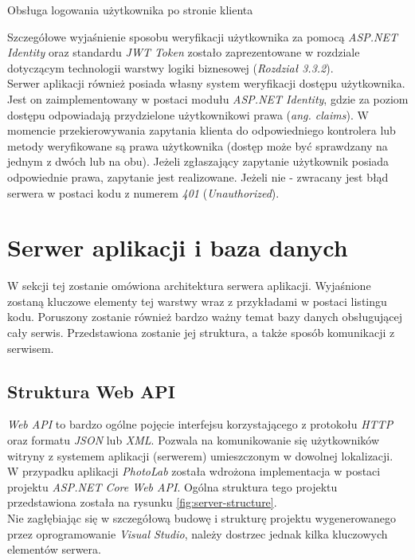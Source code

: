\begin{listing}[ht]
    \caption{Obsługa logowania użytkownika po stronie klienta}
    \label{listing:login-client}
\end{listing}

\noindent Szczegółowe wyjaśnienie sposobu weryfikacji użytkownika za pomocą \textit{ASP.NET Identity} oraz standardu \textit{JWT Token} zostało zaprezentowane w rozdziale dotyczącym technologii warstwy logiki biznesowej (\textit{Rozdział 3.3.2}).\\
    Serwer aplikacji również posiada własny system weryfikacji dostępu użytkownika. Jest on zaimplementowany w postaci modułu \textit{ASP.NET Identity}, gdzie za poziom dostępu odpowiadają przydzielone użytkownikowi  prawa (\textit{ang. claims}). W momencie przekierowywania zapytania klienta do odpowiedniego kontrolera lub metody weryfikowane są prawa użytkownika (dostęp może być sprawdzany na jednym z dwóch lub na obu). Jeżeli zgłaszający zapytanie użytkownik posiada odpowiednie prawa, zapytanie jest realizowane. Jeżeli nie - zwracany jest błąd serwera w postaci kodu z numerem \textit{401} (\textit{Unauthorized}).
    
	\section{Serwer aplikacji i baza danych}
	
	\quad W sekcji tej zostanie omówiona architektura serwera aplikacji. Wyjaśnione zostaną kluczowe elementy tej warstwy wraz z przykładami w postaci listingu kodu. Poruszony zostanie również bardzo ważny temat bazy danych obsługującej cały serwis. Przedstawiona zostanie jej struktura, a także sposób komunikacji z serwisem.
	
\subsection{Struktura Web API}
\quad \textit{Web API} to bardzo ogólne pojęcie interfejsu korzystającego z protokołu \textit{HTTP} oraz formatu \textit{JSON} lub \textit{XML}. Pozwala na komunikowanie się użytkowników witryny z systemem aplikacji (serwerem) umieszczonym w dowolnej lokalizacji. \\
W przypadku aplikacji \textit{PhotoLab} została wdrożona implementacja  w postaci projektu \textit{ASP.NET Core Web API}. Ogólna struktura tego projektu przedstawiona została na rysunku \ref{fig:server-structure}.\\
Nie zagłębiając się w szczegółową budowę i strukturę projektu wygenerowanego przez oprogramowanie \textit{Visual Studio}, należy dostrzec jednak kilka kluczowych elementów serwera.

